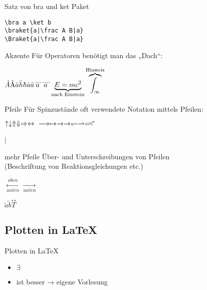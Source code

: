 \documentclass[
	vorläufig=false,
	datum=2022-11-09,
	titel={Mathematiksatz},
	web=false,
	max,
	aspectratio=1610,
]{../tex/latexkurs-slides}
\begin{document}
\begin{frame}[fragile]{Satz von bra und ket}
Paket 
\begin{lstlisting}
\bra a \ket b
\braket{a|\frac A B|a}
\Braket{a|\frac A B|a}
\end{lstlisting}
\end{frame}

\begin{frame}[fragile]{Akzente}
Für Operatoren benötigt man das „Dach“:
\begin{LTXexample}[width=.4\textwidth]
\(\hat A \hat{\mathrm{A}} \check a \\
\bar h \hbar \\ 
\dot a \ddot a \dddot a \ddddot a\\
\underbrace{E = mc^2}_\text{nach Einstein}\overbrace{\int_\infty}^{\text{Hinweis}}\)
\end{LTXexample}
\end{frame}

\begin{frame}[fragile]{Pfeile}
Für Spinzustände oft verwendete Notation mittels Pfeilen:
\begin{LTXexample}[width=.4\textwidth]
$\uparrow \downarrow \Uparrow \Downarrow
\Rightarrow \leftrightarrow\\
\longrightarrow \mapsto \to \rightarrow
\leftharpoondown \rightharpoonup \rightleftharpoons
\Rsh$
\end{LTXexample}
\end{frame}

\MakeShortVerb|
\begin{frame}[fragile]{mehr Pfeile}
Über- und Unterschreibungen von Pfeilen\\ (Beschriftung von Reaktionsgleichungen etc.)
\begin{LTXexample}
$\xleftarrow[unten]{oben}
 \xrightarrow[unten]{}$
\end{LTXexample}
\begin{LTXexample}
$\overleftarrow a
\overleftrightarrow b
\stackrel\leftrightarrow T$
\end{LTXexample}
\end{frame}


\subsection{Plotten in \LaTeX}
\begin{frame}[fragile]{Plotten in \LaTeX}
\begin{itemize}
	\item $\exists$ 
	\item {} ist besser → eigene Vorlesung
\end{itemize}
\end{frame}
\end{document}
